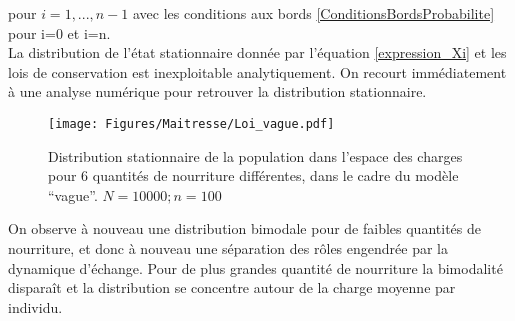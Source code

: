 pour $i=1,...,n-1$ avec les conditions aux bords \ref{ConditionsBordsProbabilite} pour i=0 et i=n.\\

La distribution de l'état stationnaire donnée par l'équation \ref{expression_Xi} et les lois de conservation est inexploitable analytiquement. On recourt immédiatement à une analyse numérique pour retrouver la distribution stationnaire.


\begin{figure}[h]
\centering
\texttt{[image: Figures/Maitresse/Loi\_vague.pdf]}
\caption{Distribution stationnaire de la population dans l'espace des charges pour 6 quantités de nourriture différentes, dans le cadre du modèle ``vague''. $N=10000; n=100$}
\label{DistribAnalytiqueVague}
\end{figure}

On observe à nouveau une distribution bimodale pour de faibles quantités de nourriture, et donc à nouveau une séparation des rôles engendrée par la dynamique d'échange. Pour de plus grandes quantité de nourriture la bimodalité disparaît et la distribution se concentre autour de la charge moyenne par individu.